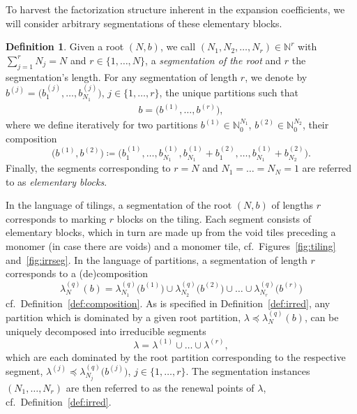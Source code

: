 \documentclass[letterpaper, DIV=17]{scrartcl}
\numberwithin{equation}{section}
\theoremstyle{definition}
\newtheorem{defn}{Definition}[section]
\begin{document}
To harvest the factorization structure inherent in the expansion coefficients, we will consider arbitrary segmentations of these elementary blocks.
%
\begin{defn} 
Given a root $ (N,b ) $, 
we call $ (N_1, N_2 , \dots , N_r) \in \mathbb{N}^r $ with $ \sum_{j=1}^r N_j = N $ and 
$ r \in \{ 1, \dots , N \} $,  a \emph{segmentation of the root} and $ r $  the segmentation's length. For any segmentation of length $ r $, we denote by $ b^{(j)} = \big( b^{(j)}_1 , \dots , b^{(j)}_{N_1} \big)  $, $ j \in \{ 1, \dots , r \} $, the unique partitions such that 
\begin{align*} b = \big(b^{(1)} , \dots , b^{(r)} \big) ,
\end{align*}
where we define iteratively for two partitions $ b^{(1)} \in \mathbb{N}_0^{N_1} $, $ b^{(2)} \in \mathbb{N}_0^{N_2} $, their composition
\begin{equation}\label{eq:bconcat}
		\big(b^{(1)},b^{(2)}\big) \coloneqq \big( b^{(1)}_1, \dots ,  b^{(1)}_{N_1} , b^{(1)}_{N_1} +b^{(2)}_1 , \dots , b^{(1)}_{N_1} +b^{(2)}_{N_2} \big) . 
		\end{equation}
Finally, the segments corresponding to $ r = N $ and $ N_1 = \dots = N_N = 1 $ are referred to as \emph{elementary blocks}. 
\end{defn}
In the language of tilings, a segmentation of the root $ (N,b) $ of lengths $ r $ corresponds to marking $ r $ blocks on the tiling. Each segment consists of elementary blocks, which in turn are made up from the void tiles preceding a monomer (in case there are voids) and a monomer tile,  cf.\ Figures~\ref{fig:tiling} and~\ref{fig:irrseg}. In the language of partitions, a segmentation of length $ r $ corresponds to a (de)composition
\begin{equation}\label{eq:segroot}
\lambda_N^{(q)}(b) = \lambda_{N_1}^{(q)}\big(b^{(1)}\big) \cup  \lambda_{N_2}^{(q)}\big(b^{(2)}\big)  \cup  \dots  \cup \lambda_{N_r}^{(q)}\big(b^{(r)}\big) 
\end{equation}
cf.~Definition~\ref{def:composition}.
As is specified in Definition~\ref{def:irred}, any partition which is dominated by a given root partition,  $ \lambda  \preceq \lambda^{(q)}_N(b) $, can be uniquely decomposed into irreducible segments 
\begin{equation}\label{eq:decomppart}
 \lambda =   \lambda^{(1)} \cup  \dots \cup \lambda^{(r)}  , 
 \end{equation}
which are each dominated by the root partition corresponding to the respective segment, $ \lambda^{(j)}  \preceq \lambda_{N_j}^{(q)}\big(b^{(j)}\big) $, $ j \in \{1 , \dots , r \} $.  The segmentation instances $ (N_1, \dots, N_r) $ are then referred to as the renewal points of $ \lambda $, cf.~Definition~\ref{def:irred}. 
\end{document}
